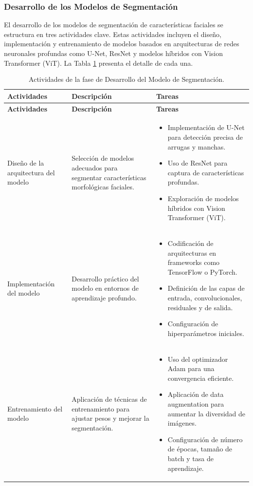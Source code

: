  \subsubsection{Desarrollo de los Modelos de Segmentación}
 El desarrollo de los modelos de segmentación de características faciales se estructura en tres actividades clave. Estas actividades incluyen el diseño, implementación y entrenamiento de modelos basados en arquitecturas de redes neuronales profundas como U-Net, ResNet y modelos híbridos con Vision Transformer (ViT). La Tabla \ref{tabla:actividades_segmentacion} presenta el detalle de cada una.

\vspace{2ex}
\begingroup
\renewcommand\arraystretch{1.2}
\begin{longtable}{p{4cm} p{6cm} p{6cm}}
\caption{Actividades de la fase de Desarrollo del Modelo de Segmentación.}
\label{tabla:actividades_segmentacion}\\
\toprule
\textbf{Actividades} & \textbf{Descripción} & \textbf{Tareas} \\
\midrule
\endfirsthead

\toprule
\textbf{Actividades} & \textbf{Descripción} & \textbf{Tareas} \\
\midrule
\endhead

\bottomrule
\endfoot

Diseño de la arquitectura del modelo & Selección de modelos adecuados para segmentar características morfológicas faciales. &
\begin{itemize}
    \item Implementación de U-Net para detección precisa de arrugas y manchas.
    \item Uso de ResNet para captura de características profundas.
    \item Exploración de modelos híbridos con Vision Transformer (ViT).
\end{itemize} \\

Implementación del modelo & Desarrollo práctico del modelo en entornos de aprendizaje profundo. &
\begin{itemize}
    \item Codificación de arquitecturas en frameworks como TensorFlow o PyTorch.
    \item Definición de las capas de entrada, convolucionales, residuales y de salida.
    \item Configuración de hiperparámetros iniciales.
\end{itemize} \\

Entrenamiento del modelo & Aplicación de técnicas de entrenamiento para ajustar pesos y mejorar la segmentación. &
\begin{itemize}
    \item Uso del optimizador Adam para una convergencia eficiente.
    \item Aplicación de data augmentation para aumentar la diversidad de imágenes.
    \item Configuración de número de épocas, tamaño de batch y tasa de aprendizaje.
\end{itemize} \\
\end{longtable}
